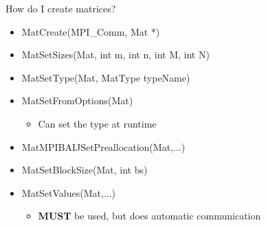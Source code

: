 \begin{frame}{How do I create matrices?}

\begin{itemize}
  \item {\kb MatCreate(MPI\_Comm, Mat *)}
  \item {\kb MatSetSizes(Mat, int m, int n, int M, int N)}
  \item {\kb MatSetType(Mat, MatType typeName)}
  \item {\kb MatSetFromOptions(Mat)}
  \begin{itemize}
    \item Can set the type at runtime
  \end{itemize}
  \item {\kb MatMPIBAIJSetPreallocation(Mat,...)} %
  \item {\kb MatSetBlockSize(Mat, int bs)}
  \item {\kb MatSetValues(Mat,...)}
  \begin{itemize}
    \item {\bf MUST} be used, but does automatic communication
  \end{itemize}
\end{itemize}

\end{frame}
